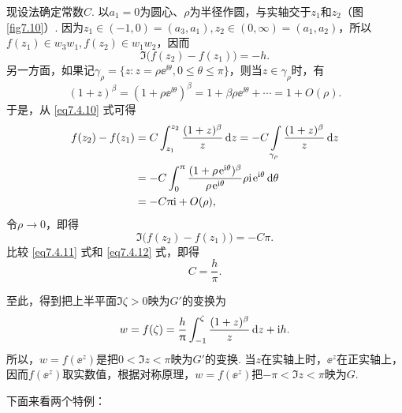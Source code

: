 \begin{solution}
  现设法确定常数$C$. 以$a_1=0$为圆心、$\rho$为半径作圆，与实轴交于$z_1$和$z_2$（图 \ref{fig7.10}）. 因为$z_1\in(-1,0)=(a_3,a_1),z_2\in(0,\infty)=(a_1,a_2)$，所以$f(z_1)\in w_3w_1,f(z_2)\in w_1w_2$，因而
  \begin{equation}\label{eq7.4.11}
    \Im \big( f(z_2) - f(z_1) \big) = -h.
  \end{equation}
  另一方面，如果记$\gamma_\rho=\{z:z=\rho\ee^{\ii\theta},0\le\theta\le\pi\}$，则当$z\in\gamma_\rho$时，有
  \[
    (1+z)^\beta = (1+\rho\ee^{\ii\theta})^\beta = 1 + \beta\rho\ee^{\ii\theta}+\cdots
    = 1 + O(\rho).
  \]
  于是，从 \eqref{eq7.4.10} 式可得
  \begin{align*}
    f(z_2) - f(z_1) & = C\int_{z_1}^{z_2}\frac{(1+z)^\beta}z\dz  = -C\int\limits_{\gamma_\rho}
      \frac{(1+z)^\beta}z\dz\\
    & = -C\int_0^\pi\frac{(1+\rho\ee^{\ii\theta})^\beta}{\rho\ee^{\ii\theta}}
      \rho\ii\ee^{\ii\theta}\dif \theta\\
    & = -C\pi\ii+O(\rho),
  \end{align*}
  令$\rho\to0$，即得
  \begin{equation}\label{eq7.4.12}
    \Im \big( f(z_2) - f(z_1) \big) = -C\pi.
  \end{equation}
  比较 \eqref{eq7.4.11} 式和 \eqref{eq7.4.12} 式，即得
  \[
    C = \frac h\pi.
  \]

  至此，得到把上半平面$\Im\zeta>0$映为$G'$的变换为
  \begin{equation}\label{eq7.4.13}
    w = f(\zeta) = \frac h{\uppi}\int_{-1}^\zeta\frac{(1+z)^\beta}z\mathop{}\!\mathrm dz + \mathrm i h.
  \end{equation}
  所以，$w=f(\ee^z)$是把$0<\Im z<\pi$映为$G'$的变换. 当$z$在实轴上时，$\ee^z$在正实轴上，因而$f(\ee^z)$取实数值，根据对称原理，$w=f(\ee^z)$把$-\pi<\Im z<\pi$映为$G$.

  下面来看两个特例：


\end{solution}
